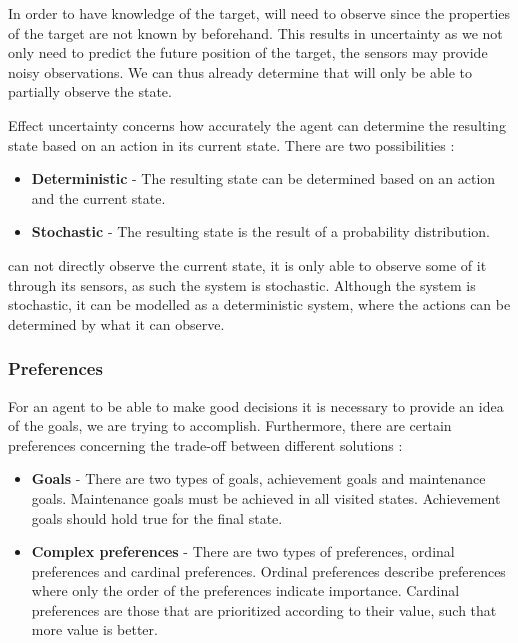 In order to have knowledge of the target, \name will need to observe since the
properties of the target are not known by \name beforehand. This results in
uncertainty as we not only need to predict the future position of the target,
the sensors may provide noisy observations. We can thus already determine that
\name will only be able to partially observe the state.\nl

Effect uncertainty concerns how accurately the agent can determine the resulting
state based on an action in its current state. There are two possibilities
\citep[ch.1.5.4]{MIBook}:
\begin{itemize}
  \item \textbf{Deterministic} - The resulting state can be determined based on
  an action and the current state.
  \item \textbf{Stochastic} - The resulting state is the result of a probability
  distribution.
\end{itemize}

\name can not directly observe the current state, it is only able
to observe some of it through its sensors, as such the system is stochastic.
Although the system is stochastic, it can be modelled as a deterministic system, where
the actions can be determined by what it can observe.
 
\subsubsection{Preferences}
For an agent to be able to make good decisions it is necessary to provide an
idea of the goals, we are trying to accomplish. Furthermore, there are certain
preferences concerning the trade-off between different solutions
\citep[ch.1.5.5]{MIBook}:

\begin{itemize}
  \item \textbf{Goals} - There are two types of goals, achievement goals and
  maintenance goals. Maintenance goals must be achieved in all visited states.
  Achievement goals should hold true for the final state.
  \item \textbf{Complex preferences} - There are two types of preferences,
  ordinal preferences and cardinal preferences. Ordinal preferences describe
  preferences where only the order of the preferences indicate importance.
  Cardinal preferences are those that are prioritized according to their value,
  such that more value is better.
\end{itemize}

